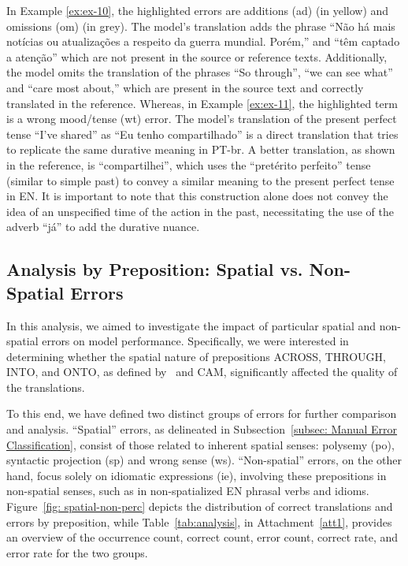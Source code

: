 In Example \ref{ex:ex-10}, the highlighted errors are additions (ad) (in yellow) and omissions (om) (in grey). The model's translation adds the phrase ``Não há mais notícias ou atualizações a respeito da guerra mundial. Porém,'' and ``têm captado a atenção'' which are not present in the source or reference texts. Additionally, the model omits the translation of the phrases ``So through'', ``we can see what'' and ``care most about,'' which are present in the source text and correctly translated in the reference. Whereas, in Example \ref{ex:ex-11}, the highlighted term is a wrong mood/tense (wt) error. The model's translation of the present perfect tense ``I've shared'' as ``Eu tenho compartilhado'' is a direct translation that tries to replicate the same durative meaning in PT-br. A better translation, as shown in the reference, is ``compartilhei'', which uses the ``pretérito perfeito'' tense (similar to simple past) to convey a similar meaning to the present perfect tense in EN. It is important to note that this construction alone does not convey the idea of an unspecified time of the action in the past, necessitating the use of the adverb ``já'' to add the durative nuance.


\subsection{Analysis by Preposition: Spatial vs. Non-Spatial Errors}

In this analysis, we aimed to investigate the impact of particular spatial and non-spatial errors on model performance. Specifically, we were interested in determining whether the spatial nature of prepositions ACROSS, THROUGH, INTO, and ONTO, as defined by~\textcite{bruckfield2011prepositions} and CAM, significantly affected the quality of the translations.

To this end, we have defined two distinct groups of errors for further comparison and analysis. ``Spatial'' errors, as delineated in Subsection~\ref{subsec: Manual Error Classification}, consist of those related to inherent spatial senses: polysemy (po), syntactic projection (sp) and wrong sense (ws). ``Non-spatial'' errors, on the other hand, focus solely on idiomatic expressions (ie), involving these prepositions in non-spatial senses, such as in non-spatialized EN phrasal verbs and idioms. Figure~\ref{fig: spatial-non-perc} depicts the distribution of correct translations and errors by preposition, while Table~\ref{tab:analysis}, in Attachment~\ref{att1}, provides an overview of the occurrence count, correct count, error count, correct rate, and error rate for the two groups.

